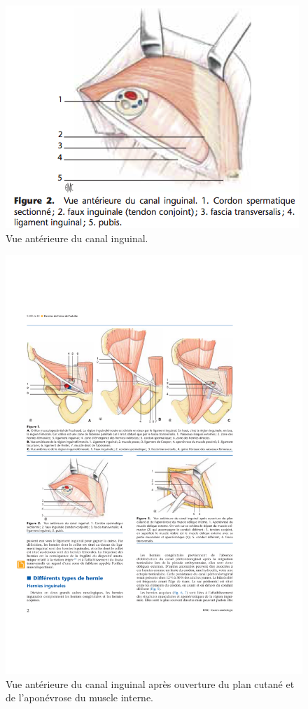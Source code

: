 \documentclass[frenc,10pt,a4paper]{article}
\begin{document}
\begin{figure}[b!]
\begin{center}
\includegraphics[width=0.70\columnwidth]{figures/Vue_Anterieure_Canal_Inguinal.png}
\caption{{Vue antérieure du canal inguinal.
{\label{Vue_Anterieure}}%
}}
\end{center}
\end{figure}

\begin{figure}[b!]
\begin{center}
\includegraphics[width=0.70\columnwidth]{figures/Vue_Anterieure_Canal_Inguinal_Apres_Ouverture.pdf}
\caption{{Vue antérieure du canal inguinal après ouverture du plan cutané et de l'aponévrose du muscle interne.
{\label{Vue_Anterieure_Ouverture}}%
}}
\end{center}
\end{figure}
\end{document}

